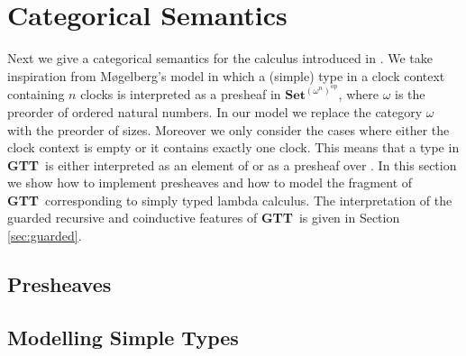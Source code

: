 \documentclass[a4paper,UKenglish,cleveref, autoref,numberwithinsect]{lipics-v2019}
\newcommand{\AD}[1]{\AgdaDatatype{#1}}
\newcommand{\F}{\AgdaFunction}
\newcommand{\GTT}{\textbf{GTT}}
\newcommand{\Set}{\mathbf{Set}}
\begin{document}
\section{Categorical Semantics}

Next we give a categorical semantics for the calculus introduced in
.  We take inspiration from M{\o}gelberg's model
\cite{Mogelberg14} in which a (simple) type in a clock context
containing $n$ clocks is interpreted
as a presheaf in $\Set^{(\omega^n)^{\text{op}}}$, where $\omega$ is
the preorder of ordered natural numbers. In our model we replace the
category $\omega$ with the preorder of sizes. Moreover we only
consider the cases where either the clock context is empty or it
contains exactly one clock. This means that a type in \GTT\ is either
interpreted as an element of \F{Set} or as a presheaf over \F{Size}. 
In this section we show how to implement presheaves and how to model
the fragment of \GTT\ corresponding to simply typed lambda
calculus. The interpretation of the guarded recursive and coinductive
features of \GTT\ is given in Section \ref{sec:guarded}.

\label{sec:presheaf_sem}
\subsection{Presheaves}
\label{sec:presheaves}







\subsection{Modelling Simple Types}
\label{sec:kripke}





\end{document}
